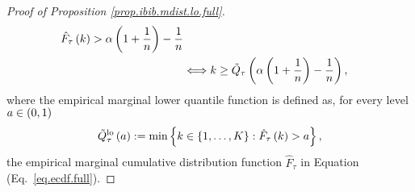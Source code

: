 \documentclass[11pt]{article}
\begin{document}
\begin{proof}[Proof of Proposition \ref{prop.ibib.mdist.lo.full}]
\begin{align*}
    \hat{F}_{\tau} \left( k \right)
    >
    \alpha \left( 1 + \frac{1}{n} \right) - \frac{1}{n}
    \\
    &
    \Longleftrightarrow
    k
    \geq
    \tilde{Q}_{\tau} \left(  \alpha \left( 1 + \frac{1}{n} \right) - \frac{1}{n} \right),
\end{align*}
where the empirical marginal lower quantile function is defined as,
for every level $a\in \left( 0, 1 \right)$
\begin{align}
    \label{eq.eqt.lo.full}
    \tilde{Q}_{\tau}^{\mathrm{lo}} \left( a \right)
    := \min \left\{ 
        k \in \left\{ 1, \ldots, K \right\} :
        \hat{F}_{\tau} \left( k \right) > a
     \right\},
\end{align}
the empirical marginal cumulative distribution function $\hat{F}_{\tau}$ in Equation (Eq.~\eqref{eq.ecdf.full}).
\end{proof}
\end{document}

